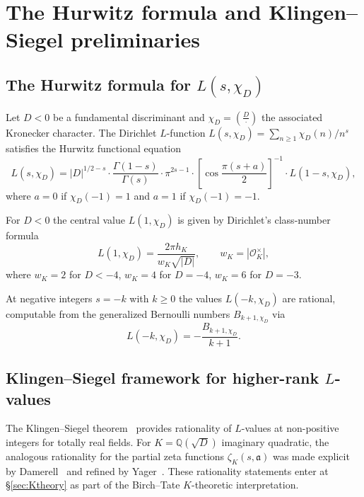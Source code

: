 \documentclass[11pt,a4paper]{amsart}
\theoremstyle{definition}
\newcommand{\Q}{\mathbb{Q}}
\newcommand{\OK}{\mathcal{O}_K}
\newcommand{\fa}{\mathfrak{a}}
\newcommand{\hK}{h_{K}}
\begin{document}
\section{The Hurwitz formula and Klingen--Siegel preliminaries}\label{sec:hurwitz}

\subsection{The Hurwitz formula for $L(s,\chi_D)$}\label{sec:hurwitz-formula}

Let $D < 0$ be a fundamental discriminant and $\chi_D = \left(\frac{D}{\cdot}\right)$ the associated Kronecker character. The Dirichlet $L$-function $L(s, \chi_D) = \sum_{n \ge 1} \chi_D(n)/n^s$ satisfies the Hurwitz functional equation~\cite[\S2.5]{Cohen2007}
\begin{equation}\label{eq:hurwitz-fe}
L(s, \chi_D) = |D|^{1/2 - s} \cdot \frac{\Gamma(1-s)}{\Gamma(s)} \cdot \pi^{2s - 1} \cdot \left[\cos \frac{\pi(s + a)}{2}\right]^{-1} \cdot L(1 - s, \chi_D),
\end{equation}
where $a = 0$ if $\chi_D(-1) = 1$ and $a = 1$ if $\chi_D(-1) = -1$.

For $D < 0$ the central value $L(1, \chi_D)$ is given by Dirichlet's class-number formula
\begin{equation}\label{eq:dirichlet-cnf}
L(1, \chi_D) = \frac{2 \pi \hK}{w_K \sqrt{|D|}}, \qquad w_K = |\OK^\times|,
\end{equation}
where $w_K = 2$ for $D < -4$, $w_K = 4$ for $D = -4$, $w_K = 6$ for $D = -3$.

At negative integers $s = -k$ with $k \ge 0$ the values $L(-k, \chi_D)$ are rational, computable from the generalized Bernoulli numbers $B_{k+1, \chi_D}$ via
\begin{equation}\label{eq:Bk}
L(-k, \chi_D) = - \frac{B_{k+1, \chi_D}}{k+1}.
\end{equation}

\subsection{Klingen--Siegel framework for higher-rank $L$-values}\label{sec:klingen}

The Klingen--Siegel theorem~\cite{Siegel1969, Klingen1962} provides rationality of $L$-values at non-positive integers for totally real fields. For $K = \Q(\sqrt{D})$ imaginary quadratic, the analogous rationality for the partial zeta functions $\zeta_K(s, \fa)$ was made explicit by Damerell~\cite{Damerell1970} and refined by Yager~\cite{Yager1982}. These rationality statements enter at \S\ref{sec:Ktheory} as part of the Birch--Tate $K$-theoretic interpretation.
\end{document}
